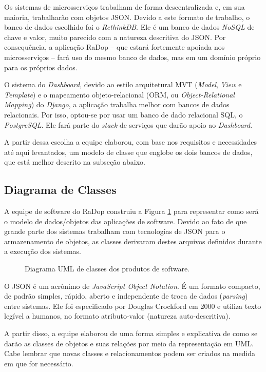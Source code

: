 Os sistemas de microsserviços trabalham de forma descentralizada e, em sua maioria, trabalharão com objetos JSON. Devido a este formato de trabalho, o banco de dados escolhido foi o \textit{RethinkDB}. Ele é um banco de dados \textit{NoSQL} de chave e valor, muito parecido com a natureza descritiva do JSON. Por consequência, a aplicação RaDop -- que estará fortemente apoiada nos microsserviços -- fará uso do mesmo banco de dados, mas em um domínio próprio para os próprios dados.

O sistema do \textit{Dashboard}, devido ao estilo arquitetural MVT (\textit{Model}, \textit{View} e \textit{Template}) e o mapeamento objeto-relacional (ORM, ou \textit{Object-Relational Mapping}) do \textit{Django}, a aplicação trabalha melhor com bancos de dados relacionais. Por isso, optou-se por usar um banco de dado relacional SQL, o \textit{PostgreSQL}. Ele fará parte do \textit{stack} de serviços que darão apoio ao \textit{Dashboard}.

A partir dessa escolha a equipe elaborou, com base nos requisitos e necessidades até aqui levantados, um modelo de classe que englobe os dois bancos de dados, que está melhor descrito na subseção abaixo.

\subsection{Diagrama de Classes}

A equipe de software do RaDop construiu a Figura \ref{fig:diagrama-classe-soft} para representar como será o modelo de dados/objetos das aplicações de software. Devido ao fato de que grande parte dos sistemas trabalham com tecnologias de JSON para o armazenamento de objetos, as classes derivaram destes arquivos definidos durante a execução dos sistemas.

\begin{figure}[H]
	\caption{\label{fig:diagrama-classe-soft} Diagrama UML de classes dos produtos de software.}
\end{figure}


O JSON é um acrônimo de \textit{JavaScript Object Notation}. É um formato compacto, de padrão simples, rápido, aberto e independente de troca de dados (\textit{parsing}) entre sistemas. Ele foi especificado por Douglas Crockford em 2000 e utiliza texto legível a humanos, no formato atributo-valor (natureza auto-descritiva)\cite{jsonorg}.

A partir disso, a equipe elaborou de uma forma simples e explicativa de como se darão as classes de objetos e suas relações por meio da representação em UML. Cabe lembrar que novas classes e relacionamentos podem ser criados na medida em que for necessário.

